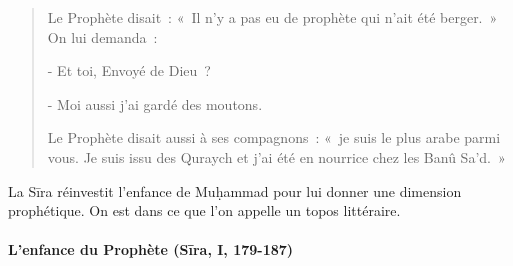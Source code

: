 \begin{quotation}
Le Prophète disait~: «~Il n'y a pas eu de prophète qui n'ait été
berger.~» On lui demanda~:

- Et toi, Envoyé de Dieu~?

- Moi aussi j'ai gardé des moutons.

Le Prophète disait aussi à ses compagnons~: «~je suis le plus arabe
parmi vous. Je suis issu des Quraych et j'ai été en nourrice chez les
Banû Sa'd.~»
\end{quotation}

La Sīra réinvestit l'enfance de Muḥammad pour lui donner une dimension
prophétique. On est dans ce que l'on appelle un topos  littéraire.


\paragraph{L'enfance du Prophète (Sīra, I,
179-187)}
    

